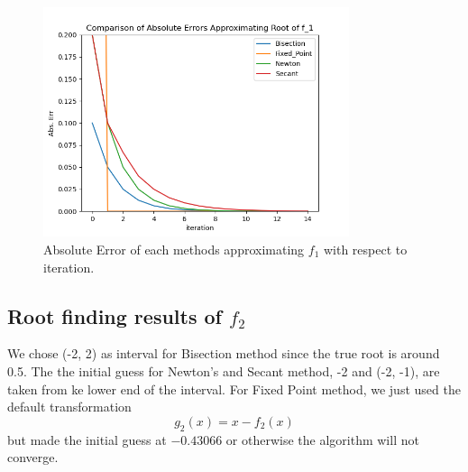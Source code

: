 \documentclass[a4paper,12pt]{article}
\begin{document}
\begin{figure}[H]
    \centering
     \includegraphics[width=0.8\textwidth]{img/report1/f1_err.png}
     \caption{Absolute Error of each methods approximating $f_1$ with respect to iteration.}
     \label{fig:2}   
\end{figure}

\subsection{Root finding results of $f_2$}

We chose (-2, 2) as interval for Bisection method since the true root is around 0.5.
The the initial guess for Newton's and Secant method,
-2 and (-2, -1),
are taken from ke lower end of the interval.
For Fixed Point method, we just used the default transformation
$$
g_2(x) = x - f_2(x)
$$
but made the initial guess at $-0.43066$ or otherwise the algorithm will not converge.
\end{document}
